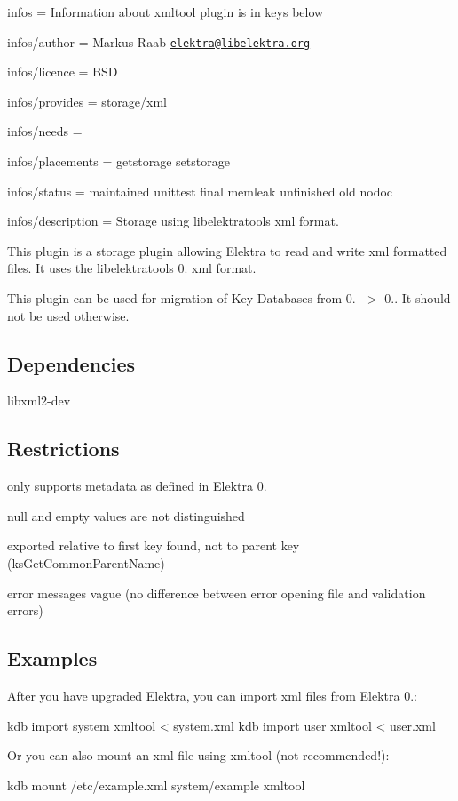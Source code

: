 
\begin{DoxyItemize}
\item infos = Information about xmltool plugin is in keys below
\item infos/author = Markus Raab \href{mailto:elektra@libelektra.org}{\tt elektra@libelektra.\+org}
\item infos/licence = B\+S\+D
\item infos/provides = storage/xml
\item infos/needs =
\item infos/placements = getstorage setstorage
\item infos/status = maintained unittest final memleak unfinished old nodoc
\item infos/description = Storage using libelektratools xml format.
\end{DoxyItemize}

This plugin is a storage plugin allowing Elektra to read and write xml formatted files. It uses the {\ttfamily libelektratools} 0. xml format.

This plugin can be used for migration of Key Databases from 0. -\/$>$ 0.. It should not be used otherwise.

\subsection*{Dependencies}


\begin{DoxyItemize}
\item {\ttfamily libxml2-\/dev}
\end{DoxyItemize}

\subsection*{Restrictions}


\begin{DoxyItemize}
\item only supports metadata as defined in Elektra 0.
\item null and empty values are not distinguished
\item exported relative to first key found, not to parent key (ks\+Get\+Common\+Parent\+Name)
\item error messages vague (no difference between error opening file and validation errors)
\end{DoxyItemize}

\subsection*{Examples}

After you have upgraded Elektra, you can import xml files from Elektra 0.\+: \begin{DoxyVerb}kdb import system xmltool < system.xml
kdb import user xmltool < user.xml
\end{DoxyVerb}


Or you can also mount an xml file using {\ttfamily xmltool} (not recommended!)\+: \begin{DoxyVerb}kdb mount /etc/example.xml system/example xmltool\end{DoxyVerb}
 